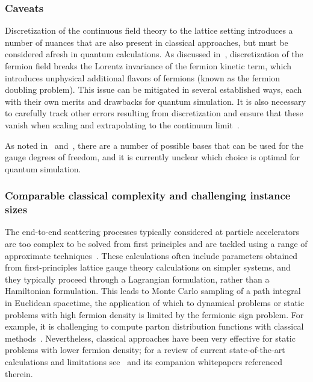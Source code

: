 \begin{refsection}

\subsubsection*{Caveats}
Discretization of the continuous field theory to the lattice setting introduces a number of nuances that are also present in classical approaches, but must be considered afresh in quantum calculations. As discussed in~\cite{mathis2020SimulationLatticeGauge}, discretization of the fermion field breaks the Lorentz invariance of the fermion kinetic term, which introduces unphysical additional flavors of fermions (known as the fermion doubling problem). This issue can be mitigated in several established ways, each with their own merits and drawbacks for quantum simulation. It is also necessary to carefully track other errors resulting from discretization and ensure that these vanish when scaling and extrapolating to the continuum limit~\cite{jordan2012QuantumFieldTheory}.

As noted in~\cite[Sec. 6b]{davoudi2022quantumHEP}  and~\cite{ciavarella2021TrailheadLatticeGaugeTheory}, there are a number of possible bases that can be used for the gauge degrees of freedom, and it is currently unclear which choice is optimal for quantum simulation.




\subsubsection*{Comparable classical complexity and challenging instance sizes}
The end-to-end scattering processes typically considered at particle accelerators are too complex to be solved from first principles and are tackled using a range of approximate techniques~\cite{gehrmann2022QCDatLHCapprox}. These calculations often include parameters obtained from first-principles lattice gauge theory calculations on simpler systems, and they typically proceed through a Lagrangian formulation, rather than a Hamiltonian formulation. This leads to Monte Carlo sampling of a path integral in Euclidean spacetime, the application of which to dynamical problems or static problems with high fermion density is limited by the fermionic sign problem. For example, it is challenging to compute parton distribution functions with classical methods~\cite{davoudi2022quantumHEP}. Nevertheless, classical approaches have been very effective for static problems with lower fermion density; for a review of current state-of-the-art calculations and limitations see~\cite{joo2019LatticeQCDReview} and its companion whitepapers referenced therein.


\end{refsection}
